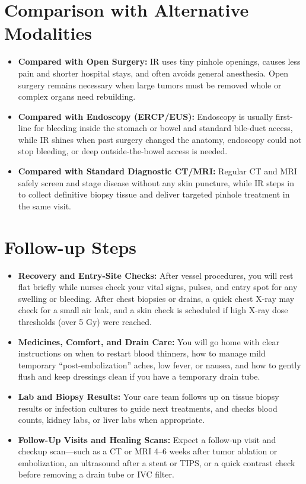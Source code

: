 \section{Comparison with Alternative Modalities}

\begin{itemize}
    \item \textbf{Compared with Open Surgery:} IR uses tiny pinhole openings, causes less pain and shorter hospital stays, and often avoids general anesthesia. Open surgery remains necessary when large tumors must be removed whole or complex organs need rebuilding.
    \item \textbf{Compared with Endoscopy (ERCP/EUS):} Endoscopy is usually first-line for bleeding inside the stomach or bowel and standard bile-duct access, while IR shines when past surgery changed the anatomy, endoscopy could not stop bleeding, or deep outside-the-bowel access is needed.
    \item \textbf{Compared with Standard Diagnostic CT/MRI:} Regular CT and MRI safely screen and stage disease without any skin puncture, while IR steps in to collect definitive biopsy tissue and deliver targeted pinhole treatment in the same visit.
\end{itemize}

\section{Follow-up Steps}

\begin{itemize}
    \item \textbf{Recovery and Entry-Site Checks:} After vessel procedures, you will rest flat briefly while nurses check your vital signs, pulses, and entry spot for any swelling or bleeding. After chest biopsies or drains, a quick chest X-ray may check for a small air leak, and a skin check is scheduled if high X-ray dose thresholds (over 5 Gy) were reached.
    \item \textbf{Medicines, Comfort, and Drain Care:} You will go home with clear instructions on when to restart blood thinners, how to manage mild temporary ``post-embolization'' aches, low fever, or nausea, and how to gently flush and keep dressings clean if you have a temporary drain tube.
    \item \textbf{Lab and Biopsy Results:} Your care team follows up on tissue biopsy results or infection cultures to guide next treatments, and checks blood counts, kidney labs, or liver labs when appropriate.
    \item \textbf{Follow-Up Visits and Healing Scans:} Expect a follow-up visit and checkup scan---such as a CT or MRI 4--6 weeks after tumor ablation or embolization, an ultrasound after a stent or TIPS, or a quick contrast check before removing a drain tube or IVC filter.
\end{itemize}


